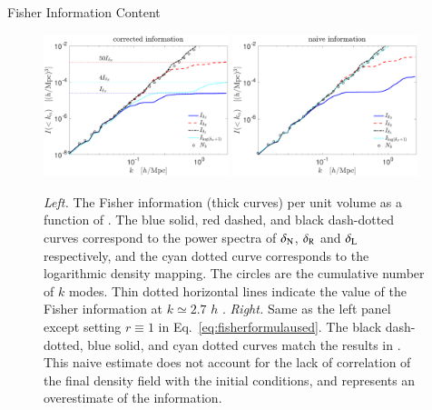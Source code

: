 \begin{section}{Fisher Information Content}
  \begin{figure}
    \includegraphics[width=0.48\textwidth]{fig4a.pdf}
    \includegraphics[width=0.48\textwidth]{fig4b.pdf}
    \centering
    \caption{{\it Left.} The Fisher information (thick curves) per unit volume as
      a function of .  The blue solid, red dashed, and black dash-dotted curves correspond to the power spectra
      of $\delta_\mathrm{\textcolor{black}{N}}$, $\delta_\mathrm{\textcolor{black}{R}}$ and $\delta_\mathrm{\textcolor{black}{L}}$ respectively,
      and the cyan dotted curve
      corresponds to the logarithmic density mapping. The circles
      are the cumulative number of $k$ modes.  Thin dotted horizontal lines indicate the value of the 
       Fisher information at $k \simeq 2.7$ $h$ .  {\it Right.} Same
      as the left panel except setting $r\equiv 1$ in Eq.~\ref{eq:fisherformulaused}. The
      black dash-dotted, blue solid, and cyan dotted curves match the results in \citealt{bib:Rimes2006,bib:Mark2009}. 
This naive estimate does not account for the lack of correlation
of the final density field with the initial conditions, and represents
an overestimate of the information.}
  \label{fig:fisherinfo}
\end{figure}
\end{section}
